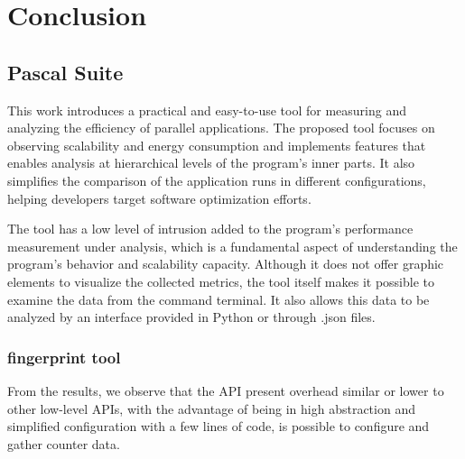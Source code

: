 \section{Conclusion} 

\subsection{Pascal Suite} \label{sec:conclusions_pascal}

This work introduces a practical and easy-to-use tool for measuring and analyzing the efficiency of parallel applications. The proposed tool focuses on observing scalability and energy consumption and implements features that enables analysis at hierarchical levels of the program's inner parts. It also simplifies the comparison of the application runs in different configurations, helping developers target software optimization efforts.

The tool has a low level of intrusion added to the program's performance measurement under analysis, which is a fundamental aspect of understanding the program's behavior and scalability capacity. 
Although it does not offer graphic elements to visualize the collected metrics, the tool itself makes it possible to examine the data from the command terminal. It also allows this data to be analyzed by an interface provided in Python or through .json files. 


\subsubsection{fingerprint tool}

From the results, we observe that the API present overhead similar or lower to other low-level APIs, with the advantage of being in high abstraction and simplified configuration with a few lines of code, is possible to configure and gather counter data.

